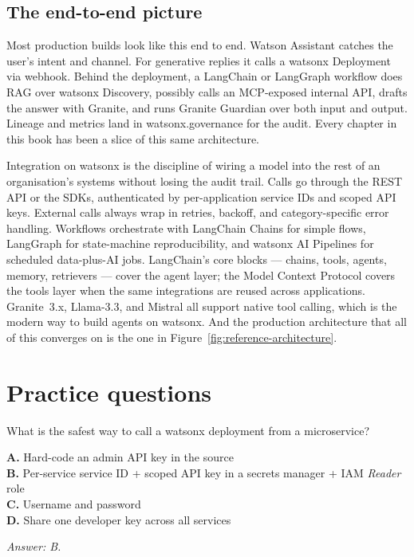\subsection{The end-to-end picture}

Most production builds look like this end to end. Watson Assistant catches the user's intent and channel. For generative replies it calls a watsonx Deployment via webhook. Behind the deployment, a LangChain or LangGraph workflow does RAG over watsonx Discovery, possibly calls an MCP-exposed internal API, drafts the answer with Granite, and runs Granite Guardian over both input and output. Lineage and metrics land in watsonx.governance for the audit. Every chapter in this book has been a slice of this same architecture.

\begin{takeawaybox}
Integration on watsonx is the discipline of wiring a model into the rest of an organisation's systems without losing the audit trail. Calls go through the REST API or the SDKs, authenticated by per-application service IDs and scoped API keys. External calls always wrap in retries, backoff, and category-specific error handling. Workflows orchestrate with LangChain Chains for simple flows, LangGraph for state-machine reproducibility, and watsonx AI Pipelines for scheduled data-plus-AI jobs. LangChain's core blocks --- chains, tools, agents, memory, retrievers --- cover the agent layer; the Model Context Protocol covers the tools layer when the same integrations are reused across applications. Granite~3.x, Llama-3.3, and Mistral all support native tool calling, which is the modern way to build agents on watsonx. And the production architecture that all of this converges on is the one in Figure~\ref{fig:reference-architecture}.
\end{takeawaybox}

\section{Practice questions}

\begin{practicebox}[title=\textbf{Q6.1 --- Auth}]
What is the safest way to call a watsonx deployment from a microservice?

\textbf{A.} Hard-code an admin API key in the source\\
\textbf{B.} Per-service service ID + scoped API key in a secrets manager + IAM \emph{Reader} role\\
\textbf{C.} Username and password\\
\textbf{D.} Share one developer key across all services

\vspace{0.2cm}\textit{Answer: B.}
\end{practicebox}

